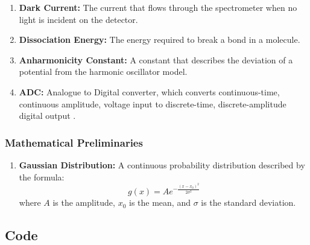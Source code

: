 \documentclass{article}
\begin{document}
\begin{enumerate}
    \item \label{kew: DarkCurrent}\textbf{Dark Current:} The current that flows through the spectrometer when no light is incident on the detector.
    
    \item \textbf{Dissociation Energy:} The energy required to break a bond in a molecule.
    
    \item \textbf{Anharmonicity Constant:} A constant that describes the deviation of a potential from the harmonic oscillator model.
    
    \item \label{kew: ADC}\textbf{ADC:} Analogue to Digital converter, which converts continuous-time, continuous amplitude, voltage input to discrete-time, discrete-amplitude digital output \cite{enwiki:1248045950}.
    
\end{enumerate}
\subsubsection{Mathematical Preliminaries}
\begin{enumerate}
    \item \textbf{Gaussian Distribution:} A continuous probability distribution described by the formula:
    \begin{equation}
        g(x) = Ae^{-\frac{(x-x_0)^2}{2\sigma^2}}
    \end{equation}
    where $A$ is the amplitude, $x_0$ is the mean, and $\sigma$ is the standard deviation.
\end{enumerate}
\subsection{Code}






\end{document}

